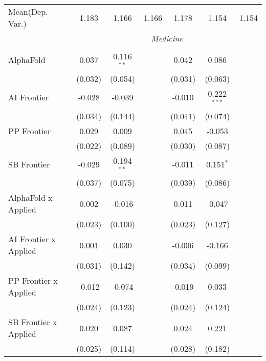\begin{tabular}{lcccccc}
Mean(Dep. Var.) & 1.183 & 1.166 & 1.166 & 1.178 & 1.154 & 1.154 \\
 & \multicolumn{6}{c}{\textit{Medicine}} \\ \\
   AlphaFold                      & 0.037   & 0.116$^{**}$ &               & 0.042   & 0.086         &   \\   
                                  & (0.032) & (0.054)      &               & (0.031) & (0.063)       &   \\   
   AI Frontier                    & -0.028  & -0.039       &               & -0.010  & 0.222$^{***}$ &   \\   
                                  & (0.034) & (0.144)      &               & (0.041) & (0.074)       &   \\   
   PP Frontier                    & 0.029   & 0.009        &               & 0.045   & -0.053        &   \\   
                                  & (0.022) & (0.089)      &               & (0.030) & (0.087)       &   \\   
   SB Frontier                    & -0.029  & 0.194$^{**}$ &               & -0.011  & 0.151$^{*}$   &   \\   
                                  & (0.037) & (0.075)      &               & (0.039) & (0.086)       &   \\   
   AlphaFold x Applied            & 0.002   & -0.016       &               & 0.011   & -0.047        &   \\   
                                  & (0.023) & (0.100)      &               & (0.023) & (0.127)       &   \\   
   AI Frontier x Applied          & 0.001   & 0.030        &               & -0.006  & -0.166        &   \\   
                                  & (0.031) & (0.142)      &               & (0.034) & (0.099)       &   \\   
   PP Frontier x Applied          & -0.012  & -0.074       &               & -0.019  & 0.033         &   \\   
                                  & (0.024) & (0.123)      &               & (0.024) & (0.124)       &   \\   
   SB Frontier x Applied          & 0.020   & 0.087        &               & 0.024   & 0.221         &   \\   
                                  & (0.025) & (0.114)      &               & (0.028) & (0.182)       &   \\   

\end{tabular}
